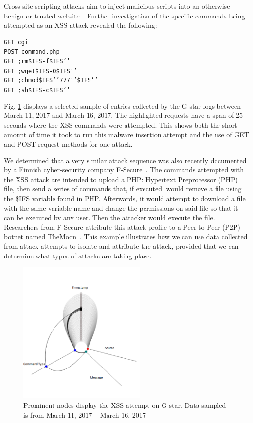 Cross-site scripting attacks aim to inject malicious scripts into an otherwise benign or trusted website~\cite{XSS-def}. 
Further investigation of the specific commands being attempted as an XSS attack revealed the following:

\noindent \texttt{GET cgi\\     
POST command.php\\
GET ;rm\$IFS-f\$IFS’'\\
GET ;wget\$IFS-O\$IFS’'\\
GET ;chmod\$IFS'’777’'\$IFS’'\\
GET ;sh\$IFS-c\$IFS‘'}

\noindent Fig. \ref{fig:XSS} displays a selected sample of entries collected by the G-star logs between March 11, 2017 and March 16, 2017. 
The highlighted requests have a span of 25 seconds where the XSS commands were attempted.
This shows both the short amount of time it took to run this malware insertion attempt and the use of GET and POST request methods for one attack.

We determined that a very similar attack sequence was also recently documented by a Finnish cyber-security company F-Secure~\cite{F-Secure}. 
The commands attempted with the XSS attack are intended to upload a PHP: Hypertext Preprocessor (PHP) file, then send a series of commands that, if executed, would remove a file using the \$IFS variable found in PHP. 
Afterwards, it would attempt to download a file with the same variable name and change the permissions on said file so that it can be executed by any user.  
Then the attacker would execute the file. 
Researchers from F-Secure  attribute this attack profile to a Peer to Peer (P2P) botnet named TheMoon~\cite{TheMoon}. 
This example illustrates how we can use data collected from attack attempts to isolate and attribute the attack, provided that we can determine what types of attacks are taking place.

\begin{figure}[t]
   \centering
   \includegraphics[width=2.5in]{images/XSS.png}  
   \caption{Prominent nodes display the XSS attempt on G-star. Data sampled is from March 11, 2017 -- March 16, 2017}
   \label{fig:XSS}
\end{figure}

